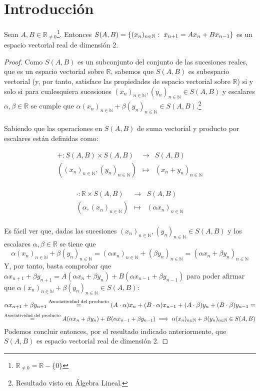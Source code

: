 \section{Introducción}
\begin{theorem}
Sean $A,B \in \mathbb{R}_{\ne 0}$\footnote{$\mathbb{R}_{\ne 0} = \mathbb{R} - \{0\}$}. Entonces $S(A,B) = \{ (x_n)_{n\in \mathbb{N}}:\textnormal{ } x_{n+1} = Ax_n + Bx_{n-1}\}$ es un espacio vectorial real de dimensión 2.
\end{theorem}

\begin{proof}

Como $S(A,B)$ es un subconjunto del conjunto de las sucesiones reales, que es un espacio vectorial sobre $\mathbb{R}$, sabemos que  $S(A,B)$ es subespacio vectorial (y, por tanto, satisface las propiedades de espacio vectorial sobre $\mathbb{R}$) si y solo si para cualesquiera sucesiones $(x_n)_{n\in \mathbb{N}}, (y_n)_{n\in \mathbb{N}} \in S(A,B)$ y escalares $\alpha, \beta \in \mathbb{R}$ se cumple que $\alpha (x_n)_{n\in \mathbb{N}} + \beta (y_n)_{n\in \mathbb{N}} \in S(A,B).$\footnote{Resultado visto en Álgebra Lineal.}
\\\\Sabiendo que las operaciones en $S(A,B)$ de suma vectorial y producto por escalares están definidas como:

$$
\begin{matrix}
+ : S(A,B) \times S(A,B) & \longrightarrow & S(A,B) \\
((x_n)_{n\in \mathbb{N}}, (y_n)_{n\in \mathbb{N}}) & \longmapsto & (x_n + y_n)_{n\in \mathbb{N}}
\end{matrix}
$$\\
$$
\begin{matrix}
\cdot : \mathbb{R} \times S(A,B) & \longrightarrow & S(A,B) \\
(\alpha, (x_n)_{n\in \mathbb{N}}) & \longmapsto & (\alpha x_n)_{n\in \mathbb{N}}
\end{matrix}
$$
\\Es fácil ver que, dadas las sucesiones $(x_n)_{n\in \mathbb{N}}, (y_n)_{n\in \mathbb{N}} \in S(A,B)$ y los escalares $\alpha, \beta \in \mathbb{R}$ se tiene que
$$
\alpha (x_n)_{n\in \mathbb{N}} + \beta (y_n)_{n\in \mathbb{N}} = (\alpha x_n)_{n\in \mathbb{N}} + (\beta y_n)_{n\in \mathbb{N}} = (\alpha x_n + \beta y_n)_{n\in \mathbb{N}}
$$
Y, por tanto, basta comprobar que $\alpha x_{n+1} + \beta y_{n+1} = A(\alpha x_n + \beta y_n) + B(\alpha x_{n-1} + \beta y_{n-1})$ para poder afirmar que $\alpha (x_n)_{n\in \mathbb{N}} + \beta (y_n)_{n\in \mathbb{N}}\in S(A,B)$:
$$
\alpha x_{n+1} + \beta y_{n+1} \overset{\textnormal{Asociatividad del producto}}{=} (A\cdot \alpha) x_n + (B\cdot \alpha)x_{n-1} + (A\cdot \beta) y_n + (B\cdot \beta)y_{n-1} =
$$
$$
\overset{\textnormal{Asociatividad del producto}}{=} A(\alpha x_n + \beta y_n) + B(\alpha x_{n-1} + \beta y_{n-1}) \implies \alpha (x_n)_{n\in \mathbb{N}} + \beta (y_n)_{n\in \mathbb{N}} \in S(A,B)
$$
Podemos concluir entonces, por el resultado indicado anteriormente, que $S(A,B)$ es espacio vectorial real de dimensión 2.

\end{proof}

